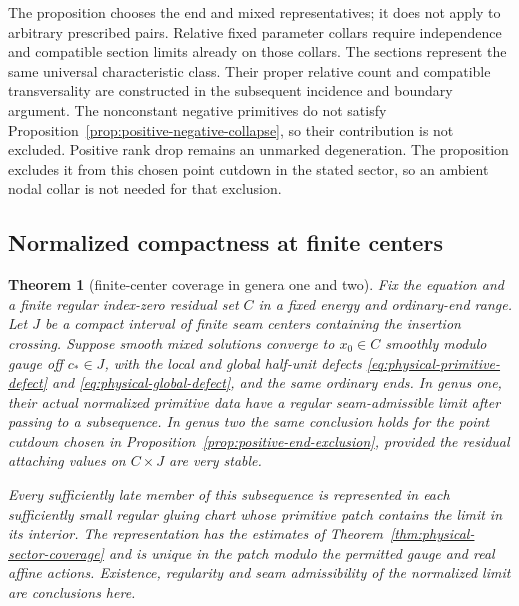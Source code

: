 \documentclass[11pt]{amsart}
\newtheorem{theorem}{Theorem}[section]
\theoremstyle{definition}
\theoremstyle{remark}
\theoremstyle{plain}
\begin{document}
The proposition chooses the end and mixed representatives;
it does not apply to arbitrary prescribed pairs.
Relative fixed parameter collars require independence and
compatible section limits already on those collars.
The sections represent the same universal characteristic class.
Their proper relative count and compatible transversality
are constructed in the subsequent incidence and boundary argument.
The nonconstant negative primitives do not satisfy
Proposition~\ref{prop:positive-negative-collapse}, so their
contribution is not excluded. Positive rank drop remains an
unmarked degeneration. The proposition excludes it from
this chosen point cutdown in the stated sector, so an
ambient nodal collar is not needed for that exclusion.

\subsection{Normalized compactness at finite centers}

\begin{theorem}[finite-center coverage in genera one and two]
\label{thm:finite-center-low-genus-coverage}
Fix the equation and a finite regular index-zero residual set $C$
in a fixed energy and ordinary-end range. Let $J$ be a compact
interval of finite seam centers containing the insertion crossing.
Suppose smooth mixed solutions
converge to $x_0\in C$ smoothly modulo gauge off $c_*\in J$,
with the local and global half-unit defects
\eqref{eq:physical-primitive-defect} and
\eqref{eq:physical-global-defect}, and the same ordinary ends.
In genus one, their actual normalized primitive data have a
regular seam-admissible limit after passing to a subsequence.
In genus two the same conclusion holds for the point cutdown
chosen in Proposition~\ref{prop:positive-end-exclusion}, provided
the residual attaching values on $C\times J$ are very stable.

Every sufficiently late member of this subsequence is represented
in each sufficiently small regular gluing chart whose primitive
patch contains the limit in its interior. The representation has
the estimates of Theorem~\ref{thm:physical-sector-coverage} and
is unique in the patch modulo the permitted gauge and real affine
actions. Existence, regularity and seam admissibility of the
normalized limit are conclusions here.
\end{theorem}
\end{document}

